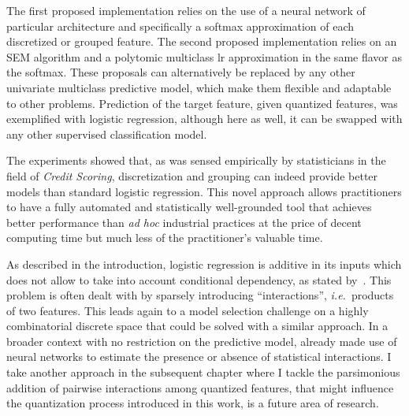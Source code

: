 The first proposed implementation relies on the use of a neural network of particular architecture and specifically a softmax approximation of each discretized or grouped feature. The second proposed implementation relies on an SEM algorithm and a polytomic multiclass \gls{lr} approximation in the same flavor as the softmax. These proposals can alternatively be replaced by any other univariate multiclass predictive model, which make them flexible and adaptable to other problems. Prediction of the target feature, given quantized features, was exemplified with logistic regression, although here as well, it can be swapped with any other supervised classification model.

The experiments showed that, as was sensed empirically by statisticians in the field of \textit{Credit Scoring}, discretization and grouping can indeed provide better models than standard logistic regression. This novel approach allows practitioners to have a fully automated and statistically well-grounded tool that achieves better performance than \textit{ad hoc} industrial practices at the price of decent computing time but much less of the practitioner's valuable time.

As described in the introduction, logistic regression is additive in its inputs which does not allow to take into account conditional dependency, as stated by~\cite{berry2010testing}. This problem is often dealt with by sparsely introducing ``interactions'', \textit{i.e.}\ products of two features. This leads again to a model selection challenge on a highly combinatorial discrete space that could be solved with a similar approach. In a broader context with no restriction on the predictive model, \cite{tsang2018detecting} already made use of neural networks to estimate the presence or absence of statistical interactions. I take another approach in the subsequent chapter where I tackle the parsimonious addition of pairwise interactions among quantized features, that might influence the quantization process introduced in this work, is a future area of research.




\printbibliography[heading=subbibliography, title=References of Chapter 3]

